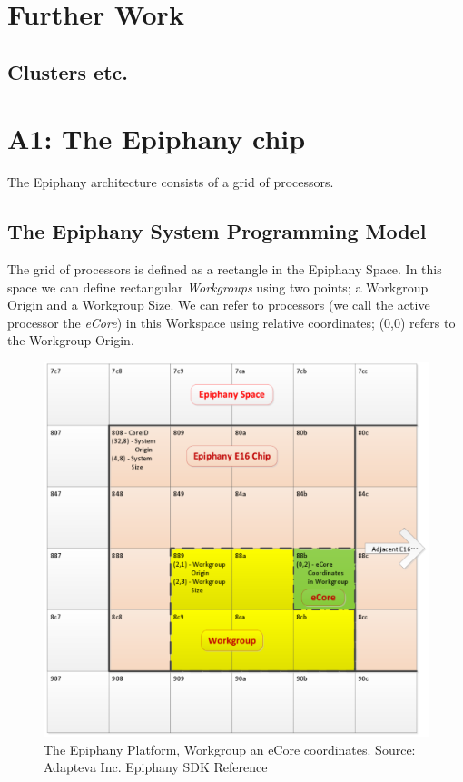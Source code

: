 \documentclass{article}
\renewcommand{\(}{\left(}
\renewcommand{\)}{\right)}
\begin{document}
\section{Further Work}

\subsection{Clusters etc.}

\section{A1: The Epiphany chip}
The Epiphany architecture consists of a grid of processors.
\subsection{The Epiphany System Programming Model}
The grid of processors is defined as a rectangle in the Epiphany Space. In this space we can define rectangular \textit{Workgroups} using two points; a Workgroup Origin and a Workgroup Size. We can refer to processors (we call the active processor the \textit{eCore}) in this Workspace using relative coordinates; (0,0) refers to the Workgroup Origin.
\begin{centering}
\begin{figure}
\centering
\includegraphics[scale=0.5]{EpiphanySpace.pdf}
\caption{The Epiphany Platform, Workgroup an eCore coordinates. Source: Adapteva Inc. Epiphany SDK Reference}
\end{figure}
\end{centering}
\end{document}
